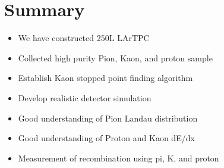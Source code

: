 \section{Summary}
\begin{itemize}
\item We have constructed 250L LArTPC
\item Collected high purity Pion, Kaon, and proton sample
\item Establish Kaon stopped point finding algorithm
\item Develop realistic detector simulation
\item Good understanding of Pion Landau distribution
\item Good understanding of Proton and Kaon dE/dx
\item Measurement of recombination using pi, K, and proton
\end{itemize}

